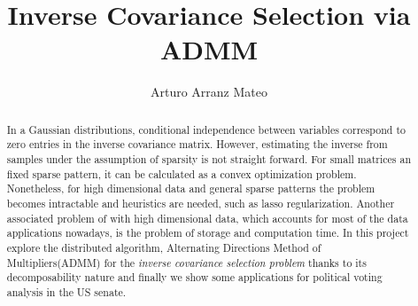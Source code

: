 \documentclass[a4paper]{article}
\title{Inverse Covariance Selection via ADMM}
\author{Arturo Arranz Mateo}
\numberwithin{equation}{section}
\begin{document}
\maketitle

\begin{abstract}
In a Gaussian distributions, conditional independence between variables correspond to zero entries in the inverse covariance matrix. However, estimating the inverse from samples under the assumption of sparsity is not straight forward. For small matrices an fixed sparse pattern, it can be calculated as a convex optimization problem. Nonetheless, for high dimensional data and general sparse patterns the problem becomes intractable and heuristics are needed, such as lasso regularization. Another associated problem of with high dimensional data, which accounts for most of the data applications nowadays, is the problem of storage and computation time. In this project explore the distributed algorithm, Alternating Directions Method of Multipliers(ADMM) for the \textit{inverse covariance selection problem} thanks to its decomposability nature and finally we show some applications for political voting analysis in the US senate. 
\end{abstract}











 
\end{document}
